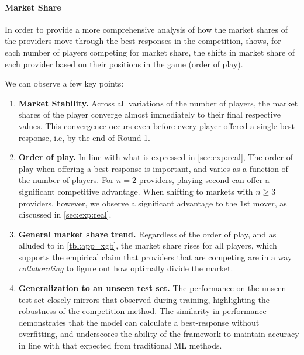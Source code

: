 \paragraph{Market Share}
In order to provide a more comprehensive analysis of how the market shares of the providers move through the best responses in the competition,   shows, for each number of players competing for market share, the shifts in market share of each provider based on their positions in the game (order of play). 

We can observe a few key points:
\begin{enumerate}
    \item \textbf{Market Stability.} Across all variations of the number of players, the market shares of the player converge almost immediately to their final respective values. This convergence occurs even before every player offered a single best-response, i.e, by the end of Round 1. 
    \item \textbf{Order of play.} In line with what is expressed in \cref{sec:exp:real}, The order of play when offering a best-response is important, and varies as a function of the number of players.
    For $n=2$ providers,  playing second can offer a significant competitive advantage.
    When shifting to markets with $n\ge 3$ providers, however, we observe a significant advantage to the 1st mover, as discussed in \cref{sec:exp:real}.
    \item \textbf{General market share trend.}
    Regardless of the order of play, and as alluded to in \cref{tbl:app_xgb}, the market share rises for all players, which supports the empirical claim that providers that are competing are in a way \emph{collaborating} to figure out how optimally divide the market.
    \item \textbf{Generalization to an unseen test set.}
    The performance on the unseen test set closely mirrors that observed during training, highlighting the robustness of the competition method. The similarity in performance demonstrates that the model can calculate a best-response without overfitting, and underscores the ability of the framework to maintain accuracy in line with that expected from traditional ML methods.    
    
\end{enumerate} 

